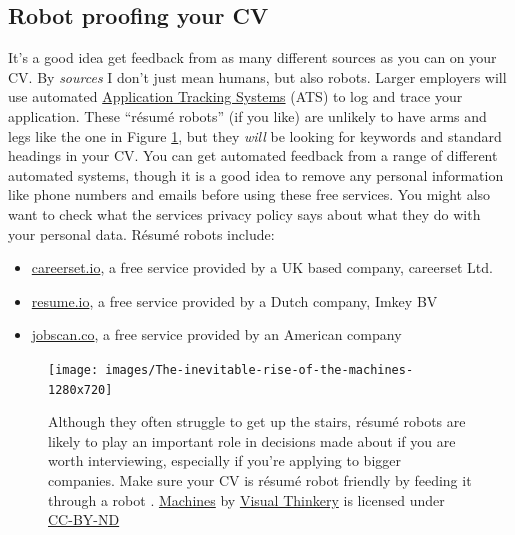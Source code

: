 \documentclass[
]{book}
\providecommand{\tightlist}{%
  \setlength{\itemsep}{0pt}\setlength{\parskip}{0pt}}
\begin{document}
\hypertarget{robotproof}{%
\subsection{Robot proofing your CV}\label{robotproof}}

It's a good idea get feedback from as many different sources as you can on your CV. By \emph{sources} I don't just mean humans, but also robots. Larger employers will use automated \href{https://en.wikipedia.org/wiki/Applicant_tracking_system}{Application Tracking Systems} (ATS) to log and trace your application. These ``résumé robots'' (if you like) are unlikely to have arms and legs like the one in Figure \ref{fig:machines-fig}, but they \emph{will} be looking for keywords and standard headings in your CV. You can get automated feedback from a range of different automated systems, though it is a good idea to remove any personal information like phone numbers and emails before using these free services. You might also want to check what the services privacy policy says about what they do with your personal data. Résumé robots include:

\begin{itemize}
\tightlist
\item
  \href{https://careerset.io}{careerset.io}, a free service provided by a UK based company, careerset Ltd.
\item
  \href{https://resume.io}{resume.io}, a free service provided by a Dutch company, Imkey BV
\item
  \href{https://www.jobscan.co}{jobscan.co}, a free service provided by an American company
\end{itemize}

\begin{figure}

{\centering \texttt{[image: images/The-inevitable-rise-of-the-machines-1280x720]} 

}

\caption{Although they often struggle to get up the stairs, résumé robots are likely to play an important role in decisions made about if you are worth interviewing, especially if you're applying to bigger companies. Make sure your CV is résumé robot friendly by feeding it through a robot . \href{https://bryanmmathers.com/machines/}{Machines} by \href{https://visualthinkery.com/}{Visual Thinkery} is licensed under \href{https://creativecommons.org/licenses/by-nd/4.0/}{CC-BY-ND}}\label{fig:machines-fig}
\end{figure}
\end{document}
